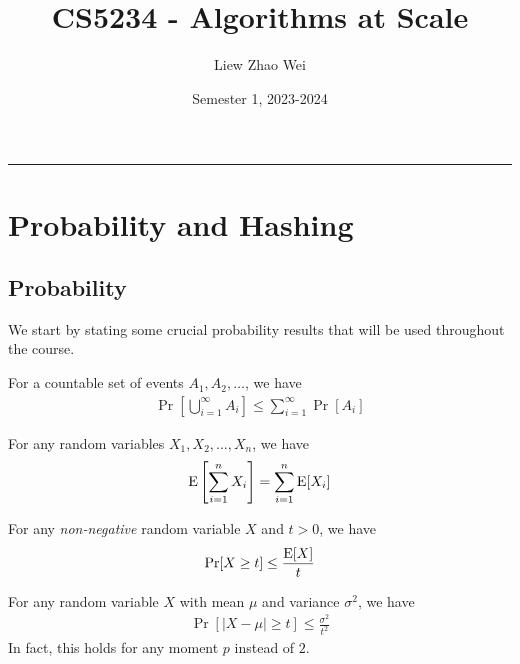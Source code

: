 \documentclass{article}
\title{CS5234 - Algorithms at Scale}
\author{Liew Zhao Wei}
\date{Semester 1, 2023-2024}
\begin{document}
\maketitle
\hrule

\section{Probability and Hashing}

\subsection{Probability}

We start by stating some crucial probability results that will be used throughout the course.

\begin{lemma}
  For a countable set of events $A_1, A_2, \ldots$, we have
  \begin{align}
    \Pr\left[\bigcup_{i=1}^\infty A_i\right] \le \sum_{i=1}^\infty \Pr[A_i]
  \end{align}
\end{lemma}

\begin{lemma}
  For any random variables $X_1, X_2, \ldots, X_n$, we have
  \begin{align}
    \operatorname{E}\left[\sum_{i=1}^n X_i\right] = \sum_{i=1}^n \operatorname{E}[X_i]
  \end{align}
\end{lemma}

\begin{lemma}
  For any \emph{non-negative} random variable $X$ and $t > 0$, we have
  \begin{align}
    \Pr[X \ge t] \le \frac{\operatorname{E}[X]}{t}
  \end{align}
\end{lemma}

\begin{lemma}
  For any random variable $X$ with mean $\mu$ and variance $\sigma^2$, we have
  \begin{align}
    \Pr[|X - \mu| \ge t] \le \frac{\sigma^2}{t^2}
  \end{align}
  In fact, this holds for any moment $p$ instead of $2$.
\end{lemma}
\end{document}
